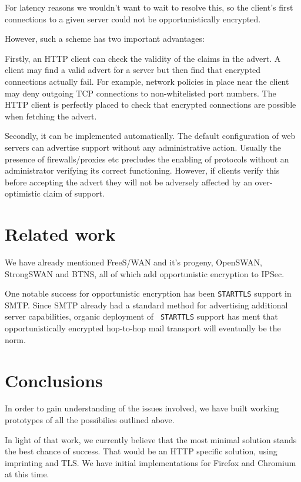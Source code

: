 \documentclass[conference]{IEEEtran}
\begin{document}
For latency reasons we wouldn't
want to wait to resolve this, so the client's first connections to a given server
could not be opportunistically encrypted.

However, such a scheme has two important advantages:

Firstly, an HTTP client can check the validity of the claims in the advert. A
client may find a valid advert for a server but then find that encrypted
connections actually fail. For example, network policies in place near the
client may deny outgoing TCP connections to non-whitelisted port numbers. The
HTTP client is perfectly placed to check that encrypted connections are
possible when fetching the advert.

Secondly, it can be implemented automatically. The default configuration of web
servers can advertise support without any administrative action. Usually the
presence of firewalls/proxies etc precludes the enabling of protocols without an
administrator verifying its correct functioning. However, if clients verify
this before accepting the advert they will not be adversely affected by an
over-optimistic claim of support.

\section{Related work}

We have already mentioned FreeS/WAN\cite{freeswan} and it's progeny, OpenSWAN,
StrongSWAN and BTNS\cite{btns}, all of which add opportunistic encryption to
IPSec.

One notable success for opportunistic encryption has been {\tt STARTTLS}
support in SMTP\cite{rfc3207}. Since SMTP already had a standard method for
advertising additional server capabilities, organic deployment of {\tt
STARTTLS} support has ment that opportunistically encrypted hop-to-hop mail
transport will eventually be the norm.

\section{Conclusions}

In order to gain understanding of the issues involved, we have built working
prototypes of all the possibilies outlined above.

In light of that work, we currently believe that the most minimal solution
stands the best chance of success. That would be an HTTP specific solution,
using imprinting and TLS. We have initial implementations for Firefox and
Chromium at this time.
\end{document}

